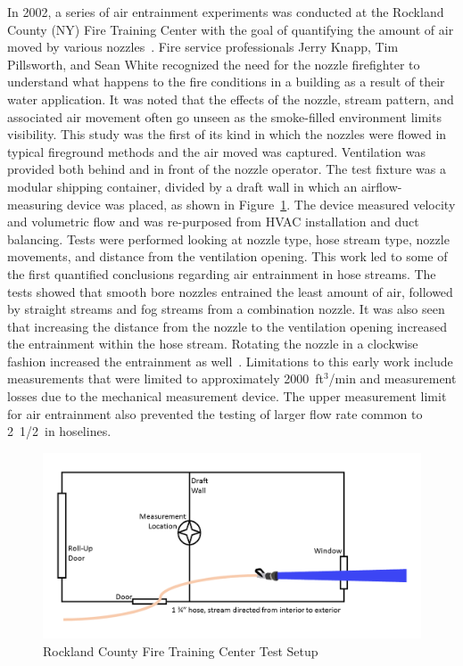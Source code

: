 \documentclass[12pt,oneside]{book}
\begin{document}
In 2002, a series of air entrainment experiments was conducted at the Rockland County (NY) Fire Training Center with the goal of quantifying the amount of air moved by various nozzles~\cite{KnappNozzles1}. Fire service professionals Jerry Knapp, Tim Pillsworth, and Sean White recognized the need for the nozzle firefighter to understand what happens to the fire conditions in a building as a result of their water application. It was noted that the effects of the nozzle, stream pattern, and associated air movement often go unseen as the smoke-filled environment limits visibility. This study was the first of its kind in which the nozzles were flowed in typical fireground methods and the air moved was captured. Ventilation was provided both behind and in front of the nozzle operator. The test fixture was a modular shipping container, divided by a draft wall in which an airflow-measuring device was placed, as shown in Figure~\ref{fig:Rockland_County_Test_Setup}. The device measured velocity and volumetric flow and was re-purposed from HVAC installation and duct balancing. Tests were performed looking at nozzle type, hose stream type, nozzle movements, and distance from the ventilation opening. This work led to some of the first quantified conclusions regarding air entrainment in hose streams. The tests showed that smooth bore nozzles entrained the least amount of air, followed by straight streams and fog streams from a combination nozzle. It was also seen that increasing the distance from the nozzle to the ventilation opening increased the entrainment within the hose stream. Rotating the nozzle in a clockwise fashion increased the entrainment as well~\cite{KnappNozzles1,KnappNozzles2,KnappNozzles3}. Limitations to this early work include measurements that were limited to approximately 2000~ft$^3$/min and measurement losses due to the mechanical measurement device. The upper measurement limit for air entrainment also prevented the testing of larger flow rate common to 2~1/2~in hoselines.

\begin{figure}[!ht]
	\centering
	\includegraphics[width=\columnwidth]{Figures/Air_Entrainment/Knapp_Layout.png}
	\caption{Rockland County Fire Training Center Test Setup}
	\label{fig:Rockland_County_Test_Setup}
\end{figure}
\end{document}
